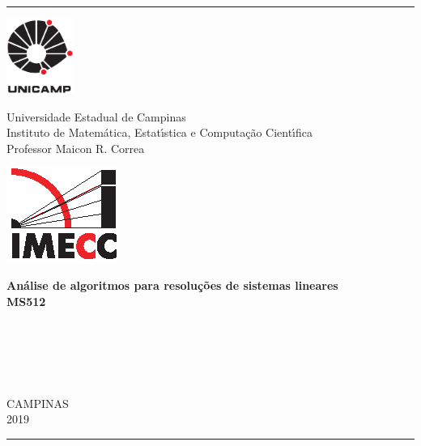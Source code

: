 \documentclass[12pt, a4paper]{article}
\begin{document}
\par


\begin{center}

\thispagestyle{empty}

\vspace*{-1.5cm}


\hspace*{-0.1cm} {\rule[-1ex]{16cm}{0.01cm}}
\begin{center}
\hspace{-1cm}
\begin{minipage}[s]{2cm}
\includegraphics[width=2.2cm]{logounicamp.eps}
\end{minipage}
\begin{minipage}[s]{11cm}
{\begin{center} {\LARGE Universidade Estadual de Campinas}\\ \vspace{0.2 cm}
{Instituto de Matem\'{a}tica, Estat\'{\i}stica e Computa\c{c}\~{a}o Cient\'{\i}fica }\\ \vspace{0.1 cm}
{Professor Maicon R. Correa}
\end{center}}
\end{minipage}\begin{minipage}[s]{1 cm}
\includegraphics[width=1.8 cm]{logoimecc.eps}
\end{minipage}
\end{center}

\vspace{3 cm}

{\Large\bf{Análise de algoritmos para resoluções de sistemas lineares}}\\
\Large{\textbf{MS512}}

\vspace{2cm}


\Large{}\\
\Large{}\\
\Large{}\\
\Large{}\\
\Large{}


\vspace{8cm}

{\small{CAMPINAS}}\\ {\small{2019}}
\end{center}
\hspace*{-0.1cm} {\rule[-1ex]{16cm}{0.01cm}}
\end{document}
